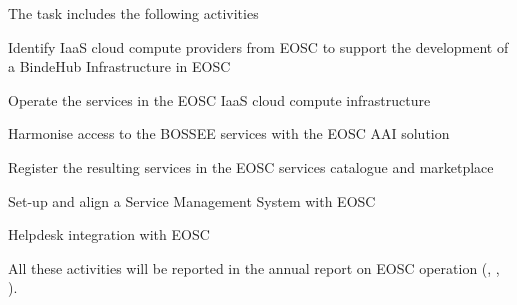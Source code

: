 \begin{task}[
  title=Collaboration with EOSC,
  id=eosc,
  lead=EGI,
  PM=24,
  wphases={12-48},
  partners={SRL,XFEL,WTT}
]
  The task includes the following activities

  \begin{compactitem}
  \item Identify IaaS cloud compute providers from EOSC to support the development of a BindeHub Infrastructure in EOSC
  \item Operate the services in the EOSC IaaS cloud compute infrastructure
  \item Harmonise access to the BOSSEE services with the EOSC AAI solution
  \item Register the resulting services in the EOSC services catalogue and marketplace
  \item Set-up and align a Service Management System with EOSC
  \item Helpdesk integration with EOSC
  \end{compactitem}

   All these activities will be reported in the annual report on EOSC operation (, , ).
\end{task}
